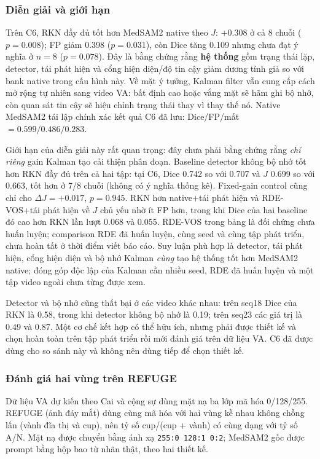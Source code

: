 \documentclass[a4paper,12pt]{report}
\begin{document}
\subsubsection{Diễn giải và giới hạn}

Trên C6, RKN đầy đủ tốt hơn MedSAM2 native theo $J$: $+0.308$ ở cả 8 chuỗi ($p=0.008$); FP giảm 0.398 ($p=0.031$), còn Dice tăng 0.109 nhưng chưa đạt ý nghĩa ở $n=8$ ($p=0.078$). Đây là bằng chứng rằng \textbf{hệ thống} gồm trạng thái lặp, detector, tái phát hiện và cổng hiện diện/độ tin cậy giảm dương tính giả so với bank native trong cấu hình này. Về mặt ý tưởng, Kalman filter vẫn cung cấp cách mở rộng tự nhiên sang video VA: bất định cao hoặc vắng mặt sẽ hãm ghi bộ nhớ, còn quan sát tin cậy sẽ hiệu chỉnh trạng thái thay vì thay thế nó. Native MedSAM2 tái lập chính xác kết quả C6 đã lưu: Dice/FP/mất $=0.599/0.486/0.283$.

Giới hạn của diễn giải này rất quan trọng: đây chưa phải bằng chứng rằng \emph{chỉ riêng} gain Kalman tạo cải thiện phân đoạn. Baseline detector không bộ nhớ tốt hơn RKN đầy đủ trên cả hai tập: tại C6, Dice 0.742 so với 0.707 và $J$ 0.699 so với 0.663, tốt hơn ở 7/8 chuỗi (không có ý nghĩa thống kê). Fixed-gain control cũng chỉ cho $\Delta J=+0.017$, $p=0.945$. RKN hơn native+tái phát hiện và RDE-VOS+tái phát hiện về $J$ chủ yếu nhờ ít FP hơn, trong khi Dice của hai baseline đó cao hơn RKN lần lượt 0.068 và 0.055. RDE-VOS trong bảng là đối chứng chưa huấn luyện; comparison RDE đã huấn luyện, cùng seed và cùng tập phát triển, chưa hoàn tất ở thời điểm viết báo cáo. Suy luận phù hợp là detector, tái phát hiện, cổng hiện diện và bộ nhớ Kalman \emph{cùng} tạo hệ thống tốt hơn MedSAM2 native; đóng góp độc lập của Kalman cần nhiều seed, RDE đã huấn luyện và một tập video ngoài chưa từng được xem.

Detector và bộ nhớ cũng thất bại ở các video khác nhau: trên seq18 Dice của RKN là 0.58, trong khi detector không bộ nhớ là 0.19; trên seq23 các giá trị là 0.49 và 0.87. Một cơ chế kết hợp có thể hữu ích, nhưng phải được thiết kế và chọn hoàn toàn trên tập phát triển rồi mới đánh giá trên dữ liệu VA. C6 đã được dùng cho so sánh này và không nên dùng tiếp để chọn thiết kế.

\subsubsection{Đánh giá hai vùng trên REFUGE}

Dữ liệu VA dự kiến theo Cai và cộng sự \cite{cai2024} dùng mặt nạ ba lớp mã hóa 0/128/255. REFUGE (ảnh đáy mắt) dùng cùng mã hóa với hai vùng kề nhau không chồng lấn (vành đĩa thị và cup), nên tỷ số cup/(cup + vành) có cùng dạng với tỷ số A/N. Mặt nạ được chuyển bằng ánh xạ \texttt{255:0 128:1 0:2}; MedSAM2 gốc được prompt bằng hộp bao từ nhãn thật, theo hai thiết kế.
\end{document}
